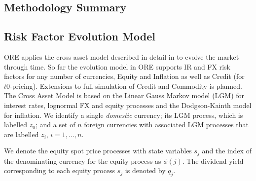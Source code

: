 \documentclass[12pt, a4paper]{article}
\begin{document}


\begin{appendix}

\section{Methodology Summary}

\subsection{Risk Factor Evolution Model}\label{sec:app_rfe}

ORE applies the cross asset model described in detail in \cite{Lichters} to evolve  the market through time. So far the
evolution model in ORE supports IR and FX risk factors for any number of currencies, Equity and Inflation as well as Credit (for $t0$-pricing). Extensions to full simulation of Credit and Commodity is planned. \\

The Cross Asset Model is based on the Linear Gauss Markov model (LGM) for interest rates, lognormal FX and equity 
processes and the Dodgson-Kainth model for inflation. We identify a single {\em domestic} currency; its LGM process, 
which is labelled $z_0$; and a set of $n$ foreign currencies with associated LGM processes that are labelled $z_i$, 
$i=1,\dots,n$. 

We denote the equity spot price processes with state variables $s_j$ and the index of the denominating 
currency for the equity process as $\phi(j)$. The dividend yield corresponding to each equity process $s_j$ is denoted 
by $q_j$.


\end{appendix}
\end{document}
